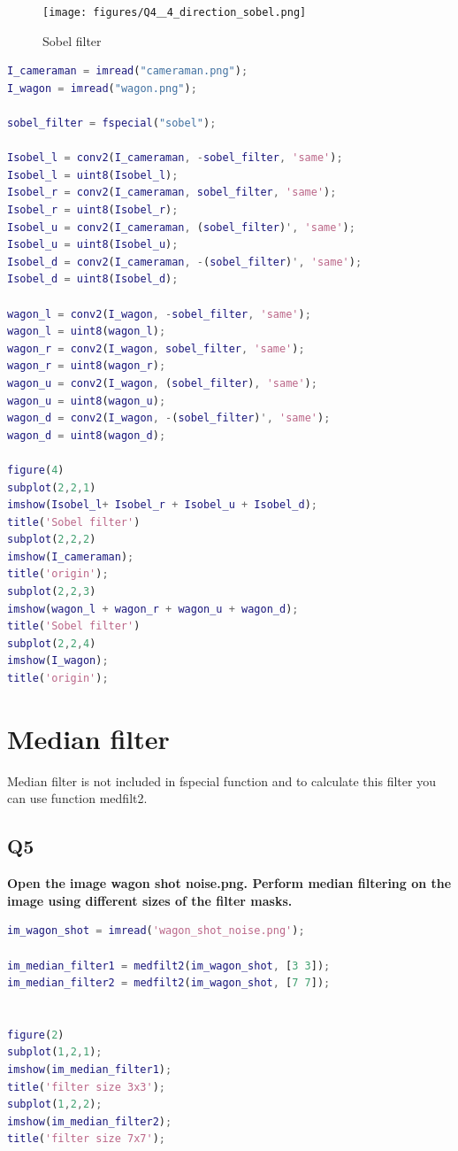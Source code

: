 \documentclass[oneside,a4paper]{article}
\begin{document}
\begin{figure}[ht!]
\centering
\texttt{[image: figures/Q4＿4\_direction\_sobel.png]}
\caption{Sobel filter}
\label{fig:Q4}
\end{figure}

\begin{lstlisting}[language=MATLAB]
I_cameraman = imread("cameraman.png");
I_wagon = imread("wagon.png");

sobel_filter = fspecial("sobel");

Isobel_l = conv2(I_cameraman, -sobel_filter, 'same');
Isobel_l = uint8(Isobel_l);
Isobel_r = conv2(I_cameraman, sobel_filter, 'same');
Isobel_r = uint8(Isobel_r);
Isobel_u = conv2(I_cameraman, (sobel_filter)', 'same');
Isobel_u = uint8(Isobel_u);
Isobel_d = conv2(I_cameraman, -(sobel_filter)', 'same');
Isobel_d = uint8(Isobel_d);
 
wagon_l = conv2(I_wagon, -sobel_filter, 'same');
wagon_l = uint8(wagon_l);
wagon_r = conv2(I_wagon, sobel_filter, 'same');
wagon_r = uint8(wagon_r);
wagon_u = conv2(I_wagon, (sobel_filter), 'same');
wagon_u = uint8(wagon_u);
wagon_d = conv2(I_wagon, -(sobel_filter)', 'same');
wagon_d = uint8(wagon_d);

figure(4)
subplot(2,2,1)
imshow(Isobel_l+ Isobel_r + Isobel_u + Isobel_d);
title('Sobel filter')
subplot(2,2,2)
imshow(I_cameraman);
title('origin');
subplot(2,2,3)
imshow(wagon_l + wagon_r + wagon_u + wagon_d);
title('Sobel filter')
subplot(2,2,4)
imshow(I_wagon);
title('origin');
\end{lstlisting}



\section{Median filter}
\noindent Median filter is not included in fspecial function and to calculate this filter you can use function medfilt2.


\subsection*{Q5}
\noindent \textbf{Open the image wagon shot noise.png. Perform median filtering on the image using different sizes of the filter masks.}
\begin{lstlisting}[language=MATLAB]
im_wagon_shot = imread('wagon_shot_noise.png');

im_median_filter1 = medfilt2(im_wagon_shot, [3 3]);
im_median_filter2 = medfilt2(im_wagon_shot, [7 7]);


figure(2)
subplot(1,2,1);
imshow(im_median_filter1);
title('filter size 3x3');
subplot(1,2,2);
imshow(im_median_filter2);
title('filter size 7x7');
\end{lstlisting}
\end{document}
